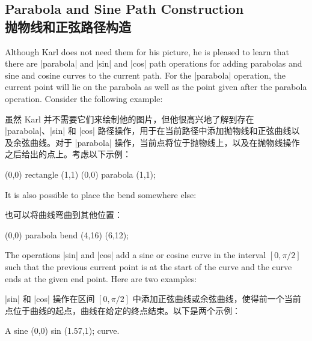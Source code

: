 
\subsection{Parabola and Sine Path Construction\\抛物线和正弦路径构造}

Although Karl does not need them for his picture, he is pleased to learn that
there are |parabola| and |sin| and |cos| path operations for adding parabolas
and sine and cosine curves to the current path. For the |parabola| operation,
the current point will lie on the parabola as well as the point given after the
parabola operation. Consider the following example:
%

虽然 Karl 并不需要它们来绘制他的图片，但他很高兴地了解到存在 |parabola|、|sin| 和 |cos| 路径操作，用于在当前路径中添加抛物线和正弦曲线以及余弦曲线。对于 |parabola| 操作，当前点将位于抛物线上，以及在抛物线操作之后给出的点上。考虑以下示例：


\begin{codeexample}[]
\tikz \draw (0,0) rectangle (1,1)  (0,0) parabola (1,1);
\end{codeexample}

It is also possible to place the bend somewhere else:
%

也可以将曲线弯曲到其他位置：


\begin{codeexample}[]
\tikz \draw[x=1pt,y=1pt] (0,0) parabola bend (4,16) (6,12);
\end{codeexample}

The operations |sin| and |cos| add a sine or cosine curve in the interval
$[0,\pi/2]$ such that the previous current point is at the start of the curve
and the curve ends at the given end point. Here are two examples:
%

|sin| 和 |cos| 操作在区间 $[0,\pi/2]$ 中添加正弦曲线或余弦曲线，使得前一个当前点位于曲线的起点，曲线在给定的终点结束。以下是两个示例：


\begin{codeexample}[]
A sine \tikz \draw[x=1ex,y=1ex] (0,0) sin (1.57,1); curve.
\end{codeexample}

